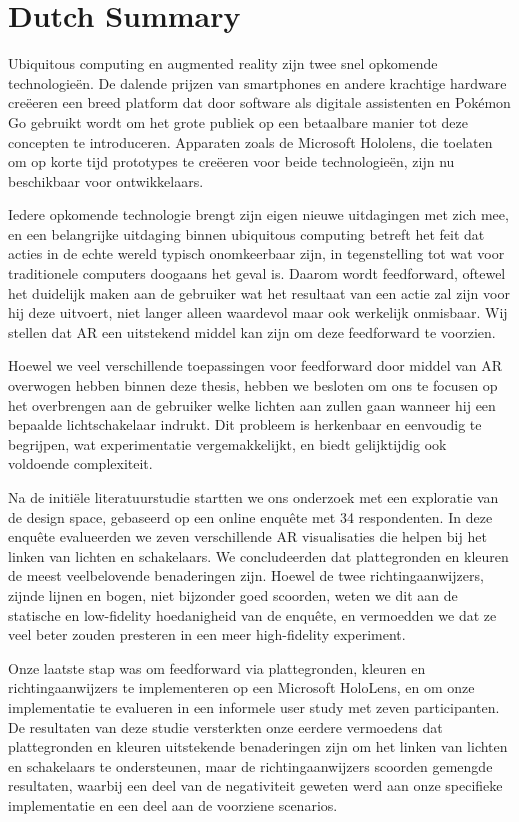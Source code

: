 \chapter{Dutch Summary} \label{chap:summary}

Ubiquitous computing en augmented reality zijn twee snel opkomende technologieën. De dalende prijzen van smartphones en andere krachtige hardware creëeren een breed platform dat door software als digitale assistenten en Pokémon Go gebruikt wordt om het grote publiek op een betaalbare manier tot deze concepten te introduceren. Apparaten zoals de Microsoft Hololens, die toelaten om op korte tijd prototypes te creëeren voor beide technologieën, zijn nu beschikbaar voor ontwikkelaars.

Iedere opkomende technologie brengt zijn eigen nieuwe uitdagingen met zich mee, en een belangrijke uitdaging binnen ubiquitous computing betreft het feit dat acties in de echte wereld typisch onomkeerbaar zijn, in tegenstelling tot wat voor traditionele computers doogaans het geval is. Daarom wordt feedforward, oftewel het duidelijk maken aan de gebruiker wat het resultaat van een actie zal zijn voor hij deze uitvoert, niet langer alleen waardevol maar ook werkelijk onmisbaar. Wij stellen dat AR een uitstekend middel kan zijn om deze feedforward te voorzien.

Hoewel we veel verschillende toepassingen voor feedforward door middel van AR overwogen hebben binnen deze thesis, hebben we besloten om ons te focusen op het overbrengen aan de gebruiker welke lichten aan zullen gaan wanneer hij een bepaalde lichtschakelaar indrukt. Dit probleem is herkenbaar en eenvoudig te begrijpen, wat experimentatie vergemakkelijkt, en biedt gelijktijdig ook voldoende complexiteit.

Na de initiële literatuurstudie startten we ons onderzoek met een exploratie van de design space, gebaseerd op een online enquête met 34 respondenten. In deze enquête evalueerden we zeven verschillende AR visualisaties die helpen bij het linken van lichten en schakelaars. We concludeerden dat plattegronden en kleuren de meest veelbelovende benaderingen zijn. Hoewel de twee richtingaanwijzers, zijnde lijnen en bogen, niet bijzonder goed scoorden, weten we dit aan de statische en low-fidelity hoedanigheid van de enquête, en vermoedden we dat ze veel beter zouden presteren in een meer high-fidelity experiment.

Onze laatste stap was om feedforward via plattegronden, kleuren en richtingaanwijzers te implementeren op een Microsoft HoloLens, en om onze implementatie te evalueren in een informele user study met zeven participanten. De resultaten van deze studie versterkten onze eerdere vermoedens dat plattegronden en kleuren uitstekende benaderingen zijn om het linken van lichten en schakelaars te ondersteunen, maar de richtingaanwijzers scoorden gemengde resultaten, waarbij een deel van de negativiteit geweten werd aan onze specifieke implementatie en een deel aan de voorziene scenarios. 

